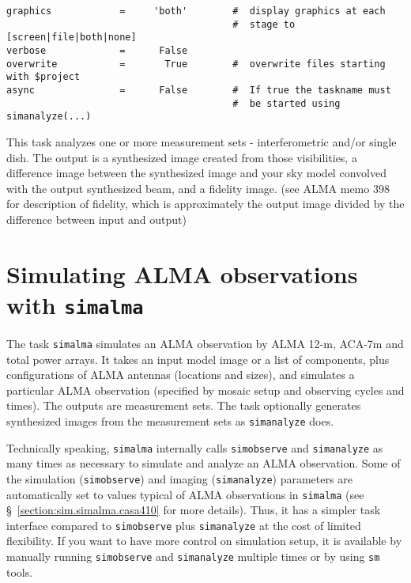 \begin{verbatim}
graphics            =     'both'        #  display graphics at each
                                        #  stage to [screen|file|both|none]
verbose             =      False        
overwrite           =       True        #  overwrite files starting with $project
async               =      False        #  If true the taskname must
                                        #  be started using simanalyze(...)
\end{verbatim}
\normalsize

This task analyzes one or more measurement sets - interferometric and/or single dish.
The output is a synthesized image created from those visibilities, a difference image
between the synthesized image and your sky model convolved with the
output synthesized beam, and a fidelity image. (see ALMA memo 398 for
description of fidelity, which is approximately the output image
divided by the difference between input and output)

\section{Simulating ALMA observations with {\tt simalma}}
\label{section:sim.simalma}

The task {\tt simalma} simulates an ALMA observation by ALMA 12-m, ACA-7m
and total power arrays.
It takes an input model image or a list of components, plus
configurations of ALMA antennas (locations and sizes), and simulates a
particular ALMA observation (specified by mosaic setup and
observing cycles and times).  The outputs are measurement sets.
The task optionally generates synthesized images from the measurement
sets as {\tt simanalyze} does. 

Technically speaking, {\tt simalma} internally
calls {\tt simobserve} and {\tt simanalyze} as many times as necessary
to simulate and analyze an ALMA observation.
Some of the simulation ({\tt simobserve}) and imaging 
({\tt simanalyze}) parameters are automatically set to values typical
of ALMA observations in {\tt simalma} (see
\S~\ref{section:sim.simalma.casa410} for more details). 
Thus, it has a simpler task interface compared to {\tt simobserve} plus
{\tt simanalyze} at the cost of limited flexibility. 
If you want to have more control on simulation setup, it is available
by manually running {\tt simobserve} and {\tt simanalyze} multiple
times or by using {\tt sm} tools.


